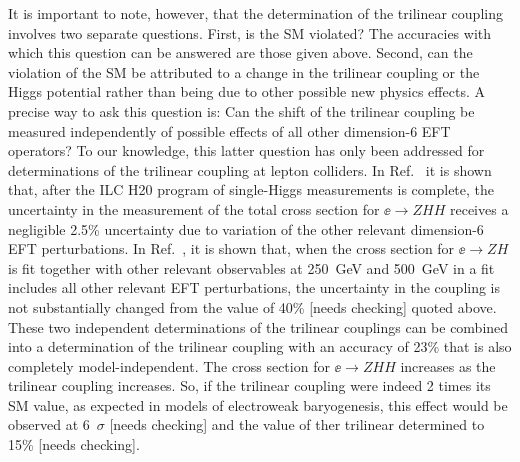 It is important to note, however, that the determination of the
trilinear coupling involves two separate questions.  First, is the SM
violated?   The accuracies with which this question can be answered
are those given above.  Second, can the violation of the SM be
attributed to a change in the trilinear coupling or the Higgs
potential rather than being due to other possible new physics
effects.  A precise way to ask this question is: Can the shift of the
trilinear coupling be measured  independently of possible effects of
all 
other dimension-6 EFT operators?   To our knowledge, this latter
question has only been addressed for determinations of the trilinear
coupling at lepton colliders.   In Ref.~\cite{Barklow:2017awn} it is
shown that, after the ILC H20 program of single-Higgs measurements is
complete, the uncertainty in the measurement of the total cross
section for  $\ee\to ZHH$ receives a negligible 2.5\% uncertainty due
to variation of the other relevant dimension-6 EFT perturbations.   In
Ref.~\cite{DiVita:2017vrr}, it is shown that, when the cross section
for $\ee\to ZH$ is fit together with other relevant observables at
250~GeV and 500~GeV
in a fit includes all other relevant EFT perturbations, the
uncertainty in the coupling is not substantially changed from the value of
40\%  [needs checking] quoted above.   These two
independent determinations of the trilinear couplings can be combined
into a determination of the trilinear coupling  with an accuracy of 23\% that is
also completely model-independent.  The cross section for $\ee\to ZHH$
increases as the  trilinear coupling increases.   So, if the trilinear coupling were
indeed 2 times its SM value, as expected in models of electroweak
baryogenesis, this effect would be observed at 6~$\sigma$ [needs
checking] and the value of ther trilinear determined to 15\% [needs
checking]. 



